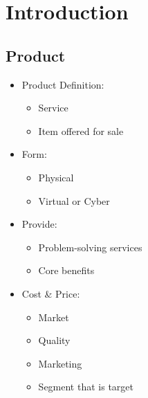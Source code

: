 \documentclass[openany,12pt,a4paper]{book}
\begin{document}
\chapter{Introduction}
\section{Product}
\begin{itemize}
    \item Product Definition: 
    \begin{itemize}
        \item Service
        \item Item offered for sale
    \end{itemize}
    \item Form:
    \begin{itemize}
        \item Physical
        \item Virtual or Cyber
    \end{itemize}
    \item Provide:
    \begin{itemize}
        \item Problem-solving services
        \item Core benefits
    \end{itemize}
    \item Cost \& Price:
    \begin{itemize}
        \item Market
        \item Quality
        \item Marketing
        \item Segment that is target
    \end{itemize}
\end{itemize}
\end{document}
